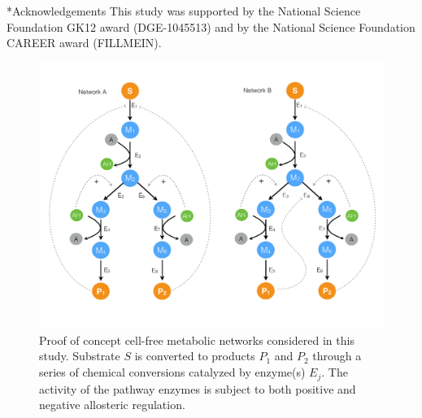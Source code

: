 \documentclass[12pt]{article}
\makeatletter
\renewcommand\section{\@startsection
	{subsection}{2}{0mm}
	{-0.2in}
	{0.05\baselineskip}
	{\normalfont\large\bfseries}}
\makeatother
\begin{document}
\section*{Acknowledgements}
This study was supported by the National Science Foundation GK12 award (DGE-1045513) 
and by the National Science Foundation CAREER award (FILLMEIN).

\clearpage
%
%




\clearpage

\begin{figure}
\centering
\includegraphics[width=1.0\textwidth]{./figs/Figure-1-Networks.pdf}
\caption{Proof of concept cell-free metabolic networks considered in this study. Substrate $S$ is converted to products $P_{1}$ and $P_{2}$ through a series of chemical conversions
catalyzed by enzyme(s) $E_{j}$. The activity of the pathway enzymes is subject to both positive and negative allosteric regulation. }\label{fig-networks}
\end{figure}

\clearpage
\end{document}
